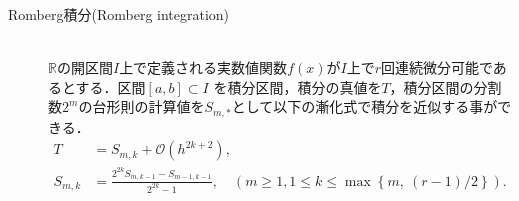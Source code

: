 \documentclass[a4j,papersize,disablejfam,slide,14pt]{jsarticle}
\def\max#1#2{\operatorname{max} \left\{ #1,\ #2 \right\}} %
\begin{document}
    \begin{screen}
    	\begin{description}
        	\item[{\rm Romberg}積分({\rm Romberg integration})]\mbox{}\\
            $\mathbb{R}$の開区間$I$上で定義される実数値関数$f(x)$が$I$上で$r$回連続微分可能であるとする．区間$[a,b] \subset I$
    		を積分区間，積分の真値を$T$，積分区間の分割数$2^m$の台形則の計算値を$S_{m,*}$として以下の漸化式で積分を近似する事ができる．
            \begin{align}
            	T &= S_{m,k} + \mathcal{O}(h^{2k+2}), \\
                S_{m,k} &= \frac{2^{2k}S_{m,k-1} - S_{m-1,k-1}}{2^{2k}-1}, \quad(m \geq 1, 1 \leq k \leq \max{m}{(r-1)/2}).
            \end{align}
        \end{description}
    \end{screen}
    
\end{document}
